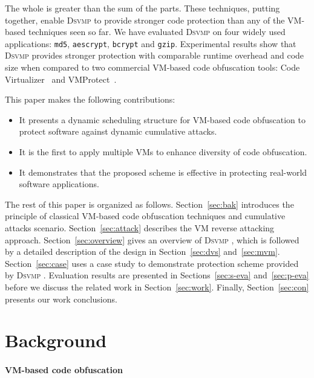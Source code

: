 \documentclass[times]{secauth}
\newcommand{\DSVMP}{\textsc{Dsvmp }}
\begin{document}
The whole is greater than the sum of the parts. These techniques, putting together,
enable \DSVMP to provide stronger code protection than any of the VM-based techniques seen so far.
We have evaluated \DSVMP on four widely used applications:  \texttt{md5}, \texttt{aescrypt}, \texttt{bcrypt} and \texttt{gzip}. Experimental results show that \DSVMP provides stronger protection with comparable runtime overhead and code size
when compared to two commercial VM-based code obfuscation tools: Code Virtualizer~\cite{2CV} and VMProtect~\cite{3Vmprotect}.


This paper makes the following contributions:
\begin{itemize}
  \item It presents a dynamic scheduling structure for VM-based code obfuscation to protect software against dynamic cumulative attacks.
  \item It is the first to apply multiple VMs to enhance diversity of code obfuscation.
  \item It demonstrates that the proposed scheme is effective in protecting real-world software applications.
\end{itemize}

The rest of this paper is organized as follows.
Section~\ref{sec:bak} introduces the principle of classical VM-based
code obfuscation techniques and cumulative attacks scenario.
Section~\ref{sec:attack} describes the VM reverse attacking approach.
Section~\ref{sec:overview} gives an overview of \DSVMP,
which is followed by a detailed description of the design in Section~\ref{sec:dvs} and~\ref{sec:mvm}.
Section~\ref{sec:case} uses a case study to demonstrate protection scheme provided by \DSVMP.
Evaluation results are presented in Sections~\ref{sec:s-eva} and~\ref{sec:p-eva} before we discuss the related work
in Section~\ref{sec:work}. Finally, Section~\ref{sec:con} presents our work conclusions.


\section{Background\label{sec:bak}}

\paragraph*{VM-based code obfuscation}
\end{document}
